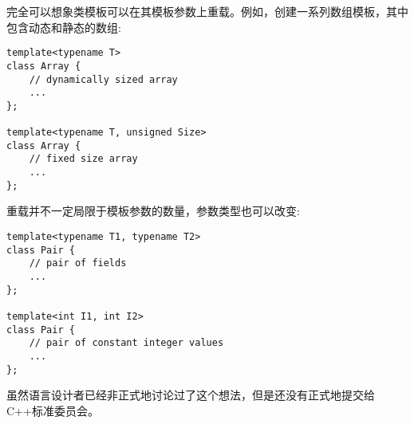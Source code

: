 完全可以想象类模板可以在其模板参数上重载。例如，创建一系列数组模板，其中包含动态和静态的数组:

\begin{lstlisting}[style=styleCXX]
template<typename T>
class Array {
	// dynamically sized array
	...
};

template<typename T, unsigned Size>
class Array {
	// fixed size array
	...
};
\end{lstlisting}

重载并不一定局限于模板参数的数量，参数类型也可以改变:

\begin{lstlisting}[style=styleCXX]
template<typename T1, typename T2>
class Pair {
	// pair of fields
	...
};

template<int I1, int I2>
class Pair {
	// pair of constant integer values
	...
};
\end{lstlisting}

虽然语言设计者已经非正式地讨论过了这个想法，但是还没有正式地提交给C++标准委员会。











































